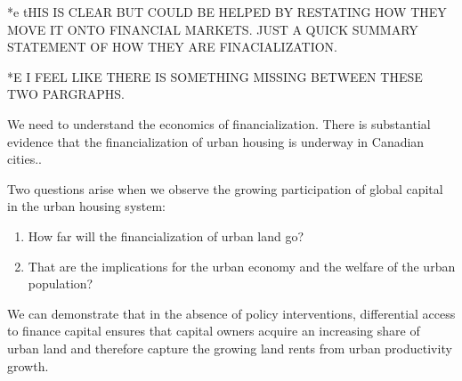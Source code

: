 



*e tHIS IS CLEAR BUT COULD BE HELPED BY RESTATING HOW THEY MOVE IT ONTO FINANCIAL MARKETS. JUST A QUICK SUMMARY STATEMENT OF HOW THEY ARE FINACIALIZATION. %

*E I FEEL LIKE THERE IS SOMETHING MISSING BETWEEN THESE TWO PARGRAPHS. %

We need to understand the economics of financialization.
There is substantial evidence that the financialization of urban housing is underway in Canadian cities..

Two questions arise when we observe the growing participation of global capital in the urban housing system: 
\begin{enumerate}
\item How far will the financialization of urban land go? 
\item That are the implications for the urban economy and the welfare of the urban population? 
\end{enumerate}

We can demonstrate that in the absence of policy interventions, differential access to finance capital ensures that capital owners acquire an increasing share of urban land %
and therefore capture the growing land rents from urban productivity growth. 

